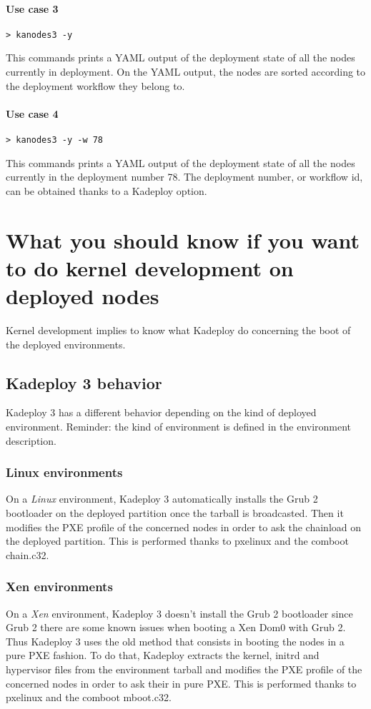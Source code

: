 \documentclass[a4wide,10pt,oneside]{book}
\begin{document}
\paragraph{Use case 3}
\begin{verbatim}
> kanodes3 -y
\end{verbatim}
This commands prints a YAML output of the deployment state of all the nodes currently in deployment. On the YAML output, the nodes are sorted according to the deployment workflow they belong to.

\paragraph{Use case 4}
\begin{verbatim}
> kanodes3 -y -w 78
\end{verbatim}
This commands prints a YAML output of the deployment state of all the nodes currently in the deployment number 78. The deployment number, or workflow id, can be obtained thanks to a Kadeploy option.

\section{What you should know if you want to do kernel development on deployed nodes}
Kernel development implies to know what Kadeploy do concerning the boot of the deployed environments.

\subsection{Kadeploy 3 behavior}
Kadeploy 3 has a different behavior depending on the kind of deployed environment. Reminder: the kind of environment is defined in the environment description.

\subsubsection{Linux environments}
On a \emph{Linux} environment, Kadeploy 3 automatically installs the Grub 2 bootloader on the deployed partition once the tarball is broadcasted. Then it modifies the PXE profile of the concerned nodes in order to ask the chainload on the deployed partition. This is performed thanks to pxelinux and the comboot chain.c32.

\subsubsection{Xen environments}
On a \emph{Xen} environment, Kadeploy 3 doesn't install the Grub 2 bootloader since Grub 2 there are some known issues when booting a Xen Dom0 with Grub 2. Thus Kadeploy 3 uses the old method that consists in booting the nodes in a pure PXE fashion. To do that, Kadeploy extracts the kernel, initrd and hypervisor files from the environment tarball and modifies the PXE profile of the concerned nodes in order to ask their in pure PXE. This is performed thanks to pxelinux and the comboot mboot.c32.
\end{document}
